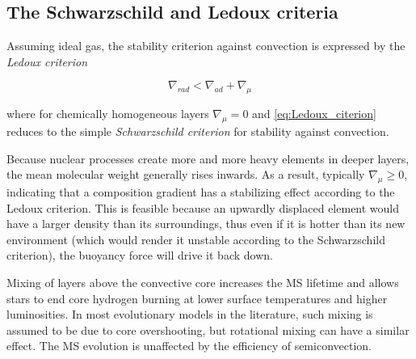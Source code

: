 \documentclass[aps,prb,twocolumn,superscriptaddress,floatfix,longbibliography]{revtex4-2}
\begin{document}
\subsection{The Schwarzschild and Ledoux criteria}

Assuming ideal gas, the stability criterion against convection is expressed by the {\it Ledoux criterion}

\begin{equation}\label{eq:Ledoux_citerion}
    \nabla_{rad} < \nabla_{ad} + \nabla_{\mu}
\end{equation}

where for chemically homogeneous layers $\nabla_{\mu} = 0$ and \eqref{eq:Ledoux_citerion} reduces to the simple {\it Schwarzschild criterion} for stability against convection.

Because nuclear processes create more and more heavy elements in deeper layers, the mean molecular weight generally rises inwards. As a result, typically $\nabla_{\mu} \geq 0$, indicating that a composition gradient has a stabilizing effect according to the Ledoux criterion. This is feasible because an upwardly displaced element would have a larger density than its surroundings, thus even if it is hotter than its new environment (which would render it unstable according to the Schwarzschild criterion), the buoyancy force will drive it back down.

Mixing of layers above the convective core increases the MS lifetime and allows stars to end core hydrogen burning at lower surface temperatures and higher luminosities. In most evolutionary models in the literature, such mixing is assumed to be due to core overshooting, but rotational mixing can have a similar effect. The MS evolution is unaffected by the efficiency of semiconvection.
\section{}

%
%
\end{document}
